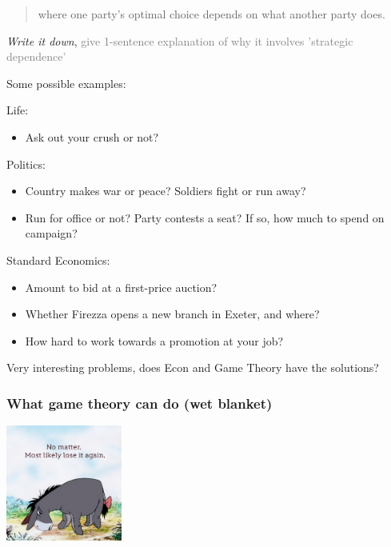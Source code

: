 \documentclass[]{article}
\providecommand{\tightlist}{%
  \setlength{\itemsep}{0pt}\setlength{\parskip}{0pt}}
\begin{document}
\begin{quote}
where one party's optimal choice depends on what another party does.
\end{quote}

\emph{Write it down}, \textcolor{gray}{give 1-sentence explanation of why it involves 'strategic dependence'}

Some possible examples:

Life:

\begin{itemize}
\tightlist
\item
  Ask out your crush or not?
\end{itemize}

\bigskip

Politics:

\begin{itemize}
\item
  Country makes war or peace? Soldiers fight or run away?
\item
  Run for office or not? Party contests a seat? If so, how much to spend on campaign?
\end{itemize}

\bigskip

Standard Economics:

\begin{itemize}
\item
  Amount to bid at a first-price auction?
\item
  Whether Firezza opens a new branch in Exeter, and where?
\item
  How hard to work towards a promotion at your job?
\end{itemize}

Very interesting problems, does Econ and Game Theory have the solutions?

\hypertarget{what-game-theory-can-do-wet-blanket}{%
\subsubsection{What game theory can do (wet blanket)}\label{what-game-theory-can-do-wet-blanket}}

\includegraphics[height=1.5in]{picsfigs/Eeyore_Pink.jpg}
\end{document}
